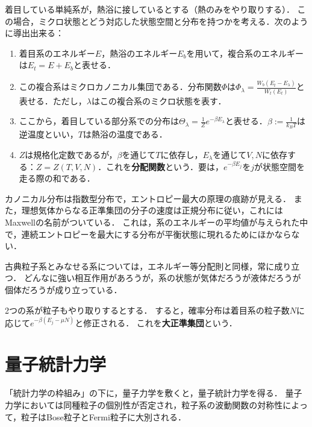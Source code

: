 \documentclass[uplatex,dvipdfmx]{jsreport}
\begin{document}
\begin{model}
    着目している単純系が，熱浴に接しているとする（熱のみをやり取りする）．
    この場合，ミクロ状態とどう対応した状態空間と分布を持つかを考える．次のように導出出来る：
    \begin{enumerate}
        \item 着目系のエネルギー$E$，熱浴のエネルギー$E_b$を用いて，複合系のエネルギーは$E_t=E+E_b$と表せる．
        \item この複合系はミクロカノニカル集団である．分布関数$\Phi$は$\Phi_\lambda=\frac{W_b(E_t-E_\lambda)}{W_t(E_t)}$と表せる．ただし，$\lambda$はこの複合系のミクロ状態を表す．
        \item ここから，着目している部分系での分布は$\Theta_\lambda=\frac{1}{Z}e^{-\beta E_\lambda}$と表せる．$\beta:=\frac{1}{k_BT}$は逆温度といい，$T$は熱浴の温度である．
        \item $Z$は規格化定数であるが，$\beta$を通じて$T$に依存し，$E_\lambda$を通じて$V,N$に依存する：$Z=Z(T,V,N)$．これを\textbf{分配関数}という．要は，$e^{-\beta E_j}$を$j$が状態空間を走る際の和である．
    \end{enumerate}
\end{model}
\begin{remarks}
    カノニカル分布は指数型分布で，エントロピー最大の原理の痕跡が見える．
    また，理想気体からなる正準集団の分子の速度は正規分布に従い，これにはMaxwellの名前がついている．
    これは，系のエネルギーの平均値が与えられた中で，連続エントロピーを最大にする分布が平衡状態に現れるためにほかならない．
\end{remarks}

\begin{example}
    古典粒子系とみなせる系については，エネルギー等分配則と同様，常に成り立つ．
    どんなに強い相互作用があろうが，系の状態が気体だろうが液体だろうが個体だろうが成り立っている．
\end{example}

\begin{model}
    2つの系が粒子もやり取りするとする．
    すると，確率分布は着目系の粒子数$N$に応じて$e^{-\beta(E_j-\mu N)}$と修正される．
    これを\textbf{大正準集団}という．
\end{model}

\section{量子統計力学}

\begin{tcolorbox}[colframe=ForestGreen, colback=ForestGreen!10!white,breakable,colbacktitle=ForestGreen!40!white,coltitle=black,fonttitle=\bfseries\sffamily,
title=]
    「統計力学の枠組み」の下に，量子力学を敷くと，量子統計力学を得る．
    量子力学においては同種粒子の個別性が否定され，粒子系の波動関数の対称性によって，粒子はBose粒子とFermi粒子に大別される．
\end{tcolorbox}
\end{document}
